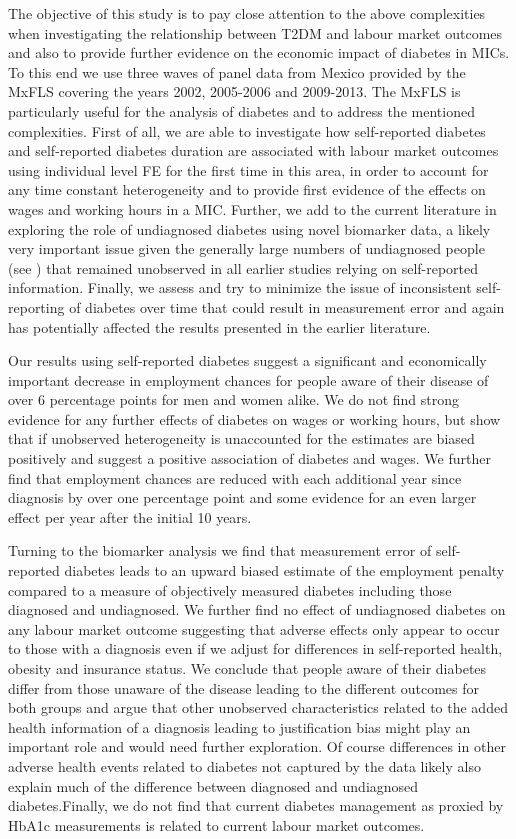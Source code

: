 \documentclass[12pt,english,british]{article}
\begin{document}
The objective of this study is to pay close attention to the above
complexities when investigating the relationship between
\ac{T2DM} and labour market outcomes and also to provide further evidence on the economic impact of diabetes in \ac{MICs}. To this end we use three waves of panel data from Mexico provided by the \ac{MxFLS} covering the years 2002, 2005-2006 and 2009-2013. The \ac{MxFLS} is particularly useful for the analysis of diabetes and to address the mentioned complexities. First of all, we are able to investigate how self-reported diabetes and self-reported diabetes duration are associated with
labour market outcomes using individual level \ac{FE} for the first time in this area, in order to account for any time constant heterogeneity and to provide first evidence of the effects on wages and working hours in a \ac{MIC}. Further, we add to the current literature in exploring the role of undiagnosed diabetes using novel biomarker data, a likely very important issue given the generally large numbers of undiagnosed people (see \citet{Beagley2014}) that remained unobserved in all earlier studies relying on self-reported information. Finally, we assess and try to minimize the issue of inconsistent self-reporting of diabetes over time that could result in measurement error and again has potentially affected the results presented in the earlier literature.

Our results using self-reported diabetes suggest a significant and economically important decrease in employment chances for people aware of their disease of over 6 percentage points for men and women alike. We do not find strong evidence for any further effects of diabetes on wages or working hours, but show that if unobserved heterogeneity is unaccounted for the estimates are biased positively and suggest a positive association of diabetes and wages. We further find that employment chances are reduced with each additional year since diagnosis by over one percentage point and some evidence for an even larger effect per year after the initial 10 years. 

Turning to the biomarker analysis we find that measurement error of self-reported diabetes leads to an upward biased estimate of the employment penalty compared to a measure of objectively measured diabetes including those diagnosed and undiagnosed. We further find no effect of undiagnosed diabetes on any labour market outcome suggesting that adverse effects only appear to occur to those with a diagnosis even if we adjust for differences in self-reported health, obesity and insurance status. We conclude that people aware of their diabetes differ from those unaware of the disease leading to the different outcomes for both groups and argue that other unobserved characteristics related to the added health information of a diagnosis leading to justification bias might play an important role and would need further exploration. Of course differences in other adverse health events related to diabetes not captured by the data likely also explain much of the difference between diagnosed and undiagnosed diabetes.Finally, we do not find that current diabetes management as proxied by \ac{HbA1c} measurements is related to current labour market outcomes.
\end{document}
